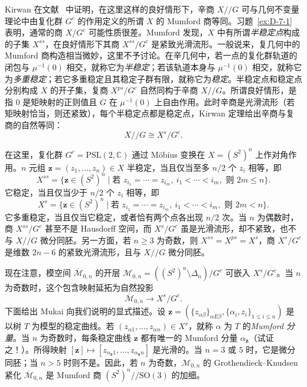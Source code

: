 Kirwan 在文献~ 中证明，在这里这样的良好情形下，辛商 $X/\!/G$ 可与几何不变量理论中由复化群 $G^c$ 的作用定义的所谓 $X$ 的 Mumford 商等同。习题~\ref{ex:D-7-1} 表明，通常的商 $X/G^c$ 可能性质很差。Mumford 发现，$X$ 中有所谓\emph{半稳定点}构成的子集 $X^{ss}$，在良好情形下其商 $X^{ss}/G^c$ 是紧致光滑流形。一般说来，复几何中的 Mumford 商构造相当微妙，这里不予讨论。在辛几何中，若一点的复化群轨道的闭包与 $\mu^{-1}(0)$ 相交，就称它为\emph{半稳定}；若该轨道本身与 $\mu^{-1}(0)$ 相交，就称它为\emph{多重稳定}；若它多重稳定且其稳定子群有限，就称它为\emph{稳定}。半稳定点和稳定点分别构成 $X$ 的开子集，复商 $X^{ps}/G^c$ 自然同构于辛商 $X/\!/G$。所谓良好情形，是指 $0$ 是矩映射的正则值且 $G$ 在 $\mu^{-1}(0)$ 上自由作用。此时辛商是光滑流形（若矩映射恰当，则还紧致），每个半稳定点都是稳定点，Kirwan 定理给出辛商与复商的自然等同：
\[
  X/\!/G\cong X^s/G^c.
\]

在这里，复化群 $G^c=\mathrm{PSL}(2,\mathbb C)$ 通过 Möbius 变换在 $X=(S^2)^n$ 上作对角作用。$n$ 元组 $\mathbf z=(z_1,\ldots,z_n)\in X$ 半稳定，当且仅当至多 $n/2$ 个 $z_i$ 相等，即
\[
  X^{ss}=\{\mathbf z\in(S^2)^n\mid
  \text{若 }z_{i_1}=\cdots=z_{i_m},\ i_1<\cdots<i_m,
  \text{ 则 }2m\le n\}.
\]
它稳定，当且仅当少于 $n/2$ 个 $z_i$ 相等，即
\[
  X^s=\{\mathbf z\in(S^2)^n\mid
  \text{若 }z_{i_1}=\cdots=z_{i_m},\ i_1<\cdots<i_m,
  \text{ 则 }2m<n\}.
\]
它多重稳定，当且仅当它稳定，或者恰有两个点各出现 $n/2$ 次。当 $n$ 为偶数时，商 $X^{ss}/G^c$ 甚至不是 Hausdorff 空间，而 $X^s/G^c$ 虽是光滑流形，却不紧致，也不与 $X/\!/G$ 微分同胚。另一方面，若 $n\ge3$ 为奇数，则 $X^{ss}=X^{ps}=X^s$，商 $X^s/G^c$ 是维数 $2n-6$ 的紧致光滑流形，且与 $X/\!/G$ 微分同胚。

现在注意，模空间 $\overline{\mathcal M}_{0,n}$ 的开层 $\mathcal M_{0,n}=((S^2)^n\setminus\Delta_n)/G^c$ 可嵌入 $X^s/G^c$。当 $n$ 为奇数时，这个包含映射延拓为自然投影
\[
  \overline{\mathcal M}_{0,n}\longrightarrow X^s/G^c.
\]
下面给出 Mukai 向我们说明的显式描述。设 $\mathbf z=(\{z_{\alpha\beta}\}_{\alpha E\beta},\{\alpha_i,z_i\}_{1\le i\le n})$ 是以树 $T$ 为模型的稳定曲线。若 $(z_{\alpha1},\ldots,z_{\alpha n})\in X^s$，就称 $\alpha$ 为 $T$ 的\emph{Mumford 分量}。当 $n$ 为奇数时，每条稳定曲线 $\mathbf z$ 都有唯一的 Mumford 分量 $\alpha_{\mathbf z}$（试证之！）。所得映射 $[\mathbf z]\mapsto[z_{\alpha_{\mathbf z}1},\ldots,z_{\alpha_{\mathbf z}n}]$ 是光滑的。当 $n=3$ 或 $5$ 时，它是微分同胚；当 $n>5$ 时则不是。因此，若 $n$ 为奇数，$\mathcal M_{0,n}$ 的 Grothendieck--Knudsen 紧化 $\overline{\mathcal M}_{0,n}$ 是 Mumford 商 $(S^2)^n/\!/\mathrm{SO}(3)$ 的加细。

